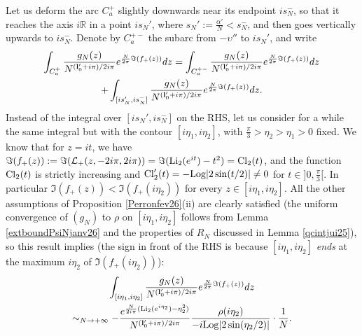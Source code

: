 \documentclass[11pt]{amsart}
\newcommand{\mr}{\mathbb{R}}
\newcommand{\Log}{{\rm Log}}
\begin{document}
{Let us deform the arc $C_a^+$ slightly downwards near its endpoint $is_N^-$, so that it reaches the axis $i\mr$ in a point $is_N'$, where $s_N':= \textstyle \frac{\alpha'}{N}<s_N^-$, and then goes vertically upwards to $is_N^-$. Denote by $C_a^{+-}$ the subarc from $-\upsilon''$ to $is_N'$, and write
\begin{multline}\label{decompintfev26}
\int_{C_a^+} \frac{g_N(z)}{N^{({\bf l}_0'+i\pi)/2i\pi}} e^{\frac{N}{2\pi}\Im(f_+(z))}dz = \int_{C_a^{+-}} \frac{g_N(z)}{N^{({\bf l}_0'+i\pi)/2i\pi}} e^{\frac{N}{2\pi}\Im(f_+(z))}dz \\ +  \int_{[is_N',is_N^-]} \frac{g_N(z)}{N^{({\bf l}_0'+i\pi)/2i\pi}} e^{\frac{N}{2\pi}\Im(f_+(z))}dz.
\end{multline}
Instead of the integral over $[is_N',is_N^-]$ on the RHS, let us consider for a while the same integral but with the contour $[i\eta_1,i\eta_2]$, with $\textstyle \frac{\pi}{3}>\eta_2>\eta_1>0$ fixed. We know that for $z=it$, we have $\Im(f_+(z)) := \Im(\mathcal{L}_+(z,-2i\pi,2i\pi))= \Im({\rm Li}_2(e^{it}) -t^2) = {\rm Cl}_2(t)$, and the function ${\rm Cl}_2(t)$ is strictly increasing and ${\rm Cl}_2'(t)= -\Log\vert 2\sin(t/2)\vert \ne 0$ for $t\in \textstyle ]0,\frac{\pi}{3}[$. In particular $\Im(f_+(z)) <\Im(f_+(i\eta_2))$ for every $z\in [i\eta_1,i\eta_2]$. All the other assumptions of Proposition \ref{Perronfev26}(ii) are clearly satisfied (the uniform convergence of $(g_N)$ to $\rho$ on $[i\eta_1,i\eta_2]$ follows from Lemma \ref{extboundPsiNjanv26} and the properties of $R_N$ discussed in Lemma \ref{qcintjui25}), so this result implies (the sign in front of the RHS is because $[i\eta_1,i\eta_2]$ {\it ends} at the maximum $i\eta_2$ of $\Im(f_+(i\eta_2))$):
\begin{multline}\label{estimateshortstep3fev26}\int_{[i\eta_1,i\eta_2]} \frac{g_N(z)}{N^{({\bf l}_0'+i\pi)/2i\pi}} e^{\frac{N}{2\pi}\Im(f_+(z))}dz \\ \sim_{N\to +\infty} -\dfrac{e^{\frac{N}{2i\pi}( {\rm Li}_2(e^{i\eta_2}) -\eta_2^2)}}{N^{({\bf l}_0'+i\pi)/2i\pi}} \dfrac{\rho(i\eta_2)}{-i\Log\vert 2\sin(\eta_2/2)\vert}\cdot \dfrac{1}{N}.  
\end{multline}
}
\end{document}
